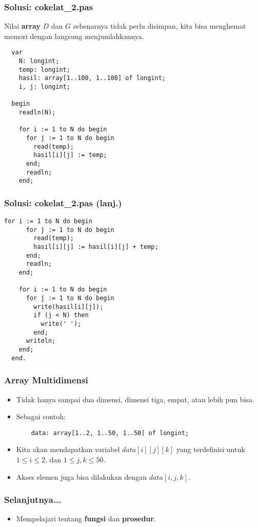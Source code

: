 \begin{frame}[fragile]
\frametitle{Solusi: cokelat\_2.pas}
Nilai \textbf{array} $D$ dan $G$ sebenarnya tidak perlu disimpan, kita bisa menghemat memori dengan langsung menjumlahkannya.
\begin{lstlisting}
  var
    N: longint;
    temp: longint;
    hasil: array[1..100, 1..100] of longint;
    i, j: longint;

  begin
    readln(N);

    for i := 1 to N do begin
      for j := 1 to N do begin
        read(temp);
        hasil[i][j] := temp;
      end;
      readln;
    end;
\end{lstlisting}
\end{frame}

\begin{frame}[fragile]
\frametitle{Solusi: cokelat\_2.pas (lanj.)}
\begin{lstlisting}[gobble=2]
    for i := 1 to N do begin
      for j := 1 to N do begin
        read(temp);
        hasil[i][j] := hasil[i][j] + temp;
      end;
      readln;
    end;

    for i := 1 to N do begin
      for j := 1 to N do begin
        write(hasil[i][j]);
        if (j < N) then
          write(' ');
        end;
      writeln;
    end;
  end.
\end{lstlisting}
\end{frame}

\begin{frame}[fragile]
\frametitle{Array Multidimensi}
\begin{itemize}
  \item Tidak hanya sampai dua dimensi, dimensi tiga, empat, atau lebih pun bisa.
  \item Sebagai contoh:
  \begin{lstlisting}
    data: array[1..2, 1..50, 1..50] of longint;
  \end{lstlisting}
  \item Kita akan mendapatkan variabel $data[i][j][k]$ yang terdefinisi untuk $1 \le i \le 2$, dan $1 \le j, k \le 50$.
  \item Akses elemen juga bisa dilakukan dengan $data[i,j,k]$.
\end{itemize}
\end{frame}

\begin{frame}
\frametitle{Selanjutnya...}
\begin{itemize}
  \item Mempelajari tentang \textbf{fungsi} dan \textbf{prosedur}.
\end{itemize}
\end{frame}


